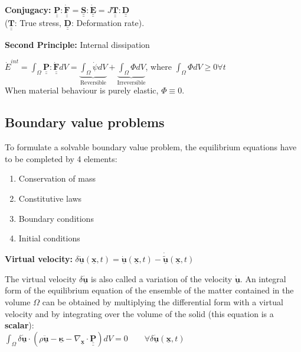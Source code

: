 \textbf{Conjugacy:} $ \underline{\underline{\mathbf{P}}} : \underline{\underline{\mathbf{\dot{F}}}} = \underline{\underline{\mathbf{S}}} : \underline{\underline{\mathbf{\dot{E}}}} = J \underline{\underline{\mathbf{T}}} : \underline{\underline{\mathbf{D}}}$ \\ ($\underline{\underline{\mathbf{T}}}$: True stress, $\underline{\underline{\mathbf{D}}}$: Deformation rate).

\textbf{Second Principle:} Internal dissipation

$\dot{E}^{int} = \int_\Omega \underline{\underline{\mathbf{P}}} : \underline{\underline{\mathbf{\dot{F}}}} dV = \underbrace{\int_\Omega \dot{\psi} dV}_{\text{Reversible}} + \underbrace{\int_\Omega \Phi dV}_{\text{Irreversible}}$, where $\int_\Omega \Phi dV \geq 0 \forall t$ \\
When material behaviour is purely elastic, $\Phi \equiv 0$. \\


\subsection*{Boundary value problems}
\smallskip

To formulate a solvable boundary value problem, the equilibrium equations have to be completed by 4 elements:
 \begin{enumerate}
 \item Conservation of mass
 \item Constitutive laws
 \item Boundary conditions
 \item Initial conditions
 \end{enumerate}
 
\textbf{Virtual velocity:} $\delta \underline{\mathbf{\dot{u}}}(\underline{\mathbf{x}},t)=\underline{\mathbf{\dot{u}}}(\underline{\mathbf{x}},t)-\underline{\mathbf{\dot{\tilde{u}}}}(\underline{\mathbf{x}},t)$

The virtual velocity $\delta \underline{\mathbf{\dot{u}}}$ is also called a variation of the velocity $\underline{\mathbf{\dot{u}}}$. An integral form of the equilibrium equation of the ensemble of the matter contained in the volume $\Omega$ can be obtained by multiplying the differential form with a virtual velocity and by integrating over the volume of the solid (this equation is a \textbf{scalar}): \\

$\int_\Omega \delta \underline{\mathbf{\dot{u}}} \cdot (\rho \underline{\mathbf{\ddot{u}}}-\underline{\mathbf{\kappa}}-\nabla_{\underline{\mathbf{x}}} \cdot \underline{\underline{\mathbf{P}}})dV= 0
\qquad \forall \delta \underline{\mathbf{\dot{u}}}(\underline{\mathbf{x}},t)$ \\

